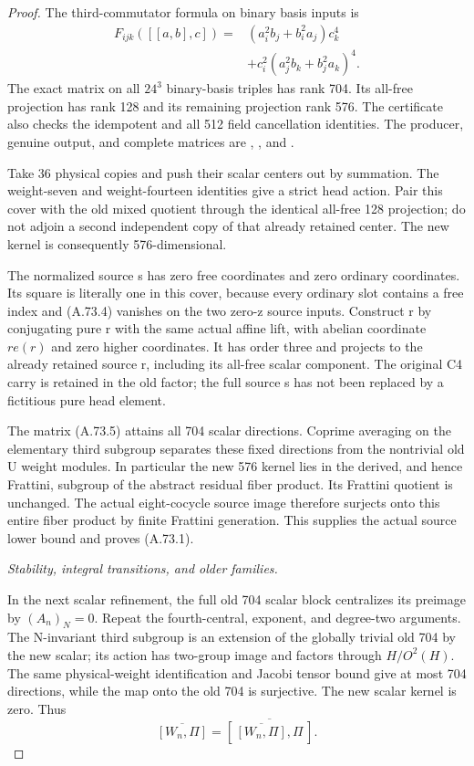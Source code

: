 \begin{proof}
The third-commutator formula on binary basis inputs is
\[
 \begin{split}
 F_{ijk}([[a,b],c])={}&
 (a_i^2b_j+b_i^2a_j)c_k^4\\
 &+c_i^2(a_j^2b_k+b_j^2a_k)^4.
 \end{split}
 \tag{A.73.5}
\]
The exact matrix on all \(24^3\) binary-basis triples has rank 704.
Its all-free projection has rank 128 and its remaining projection
rank 576. The certificate also checks the idempotent and all 512
field cancellation identities. The producer, genuine output, and
complete matrices are
,
, and
.

Take 36 physical copies and push their scalar centers out by summation.
The weight-seven and weight-fourteen identities give a strict head
action. Pair this cover with the old mixed quotient through the
identical all-free 128 projection; do not adjoin a second independent
copy of that already retained center. The new kernel is consequently
576-dimensional.

The normalized source s has zero free coordinates and zero ordinary
coordinates. Its square is literally one in this cover, because every
ordinary slot contains a free index and (A.73.4) vanishes on the two
zero-z source inputs. Construct r by conjugating pure r with the
same actual affine lift, with abelian coordinate \(r e(r)\) and
zero higher coordinates. It has order three and projects to the
already retained source r, including its all-free scalar component.
The original C4 carry is retained in the old factor; the full source
s has not been replaced by a fictitious pure head element.

The matrix (A.73.5) attains all 704 scalar directions. Coprime averaging
on the elementary third subgroup separates these fixed directions
from the nontrivial old U weight modules. In particular the new 576
kernel lies in the derived, and hence Frattini, subgroup of the abstract
residual fiber product. Its Frattini quotient is unchanged. The actual
eight-cocycle source image therefore surjects onto this entire fiber
product by finite Frattini generation. This supplies the actual
source lower bound and proves (A.73.1).

\emph{Stability, integral transitions, and older families.}\par
In the next scalar refinement, the full old 704 scalar block
centralizes its preimage by \((A_n)_N=0\). Repeat the fourth-central,
exponent, and degree-two arguments. The N-invariant third subgroup is
an extension of the globally trivial old 704 by the new scalar; its
action has two-group image and factors through \(H/O^2(H)\).
The same physical-weight identification and Jacobi tensor bound give
at most 704 directions, while the map onto the old 704 is surjective.
The new scalar kernel is zero. Thus
\[
 \overline{[W_n,\Pi]}
   =\overline{[\,\overline{[W_n,\Pi]},\Pi\,]}.
 \tag{A.73.6}
\]


\end{proof}
